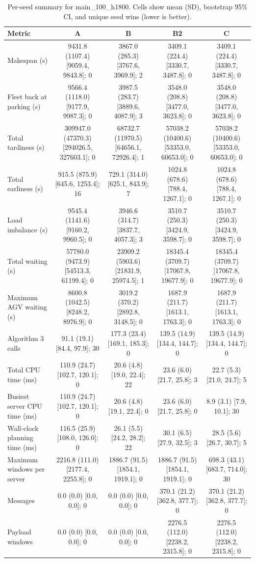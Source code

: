 \begin{table}[t]
\centering
\caption{Per-seed summary for main\_100\_h1800. Cells show mean (SD), bootstrap 95\% CI, and unique seed wins (lower is better).}
\label{tab:main-100-h1800}
\begin{tabular}{lcccc}
\toprule
Metric & A & B & B2 & C \\
\midrule
Makespan (s) & 9431.8 (1107.4) [9059.4, 9843.8]; 0 & 3867.0 (285.3) [3767.6, 3969.9]; 2 & 3409.1 (224.4) [3330.7, 3487.8]; 0 & 3409.1 (224.4) [3330.7, 3487.8]; 0 \\
Fleet back at parking (s) & 9566.4 (1118.0) [9177.9, 9987.3]; 0 & 3987.5 (283.7) [3889.6, 4087.9]; 3 & 3548.0 (208.8) [3477.0, 3623.8]; 0 & 3548.0 (208.8) [3477.0, 3623.8]; 0 \\
Total tardiness (s) & 309947.0 (47370.3) [294026.5, 327603.1]; 0 & 68732.7 (11970.5) [64656.1, 72926.4]; 1 & 57038.2 (10400.6) [53353.0, 60653.0]; 0 & 57038.2 (10400.6) [53353.0, 60653.0]; 0 \\
Total earliness (s) & 915.5 (875.9) [645.6, 1253.4]; 16 & 729.1 (314.0) [625.1, 843.9]; 7 & 1024.8 (678.6) [788.4, 1267.1]; 0 & 1024.8 (678.6) [788.4, 1267.1]; 0 \\
Load imbalance (s) & 9545.4 (1141.6) [9160.2, 9960.5]; 0 & 3946.6 (314.7) [3837.7, 4057.3]; 3 & 3510.7 (250.3) [3424.9, 3598.7]; 0 & 3510.7 (250.3) [3424.9, 3598.7]; 0 \\
Total waiting (s) & 57780.0 (9473.9) [54513.3, 61199.4]; 0 & 23909.2 (5903.6) [21831.9, 25974.5]; 1 & 18345.4 (3709.7) [17067.8, 19677.9]; 0 & 18345.4 (3709.7) [17067.8, 19677.9]; 0 \\
Maximum AGV waiting (s) & 8600.8 (1042.5) [8248.2, 8976.9]; 0 & 3019.2 (370.2) [2892.8, 3148.5]; 0 & 1687.9 (211.7) [1613.1, 1763.3]; 0 & 1687.9 (211.7) [1613.1, 1763.3]; 0 \\
Algorithm 3 calls & 91.1 (19.1) [84.4, 97.9]; 30 & 177.3 (23.4) [169.1, 185.3]; 0 & 139.5 (14.9) [134.4, 144.7]; 0 & 139.5 (14.9) [134.4, 144.7]; 0 \\
Total CPU time (ms) & 110.9 (24.7) [102.7, 120.1]; 0 & 20.6 (4.8) [19.0, 22.4]; 22 & 23.6 (6.0) [21.7, 25.8]; 3 & 22.7 (5.3) [21.0, 24.7]; 5 \\
Busiest server CPU time (ms) & 110.9 (24.7) [102.7, 120.1]; 0 & 20.6 (4.8) [19.1, 22.4]; 0 & 23.6 (6.0) [21.7, 25.8]; 0 & 8.9 (3.1) [7.9, 10.1]; 30 \\
Wall-clock planning time (ms) & 116.5 (25.9) [108.0, 126.0]; 0 & 26.1 (5.5) [24.2, 28.2]; 22 & 30.1 (6.5) [27.9, 32.5]; 3 & 28.5 (5.6) [26.7, 30.7]; 5 \\
Maximum windows per server & 2216.8 (111.0) [2177.4, 2255.8]; 0 & 1886.7 (91.5) [1854.1, 1919.1]; 0 & 1886.7 (91.5) [1854.1, 1919.1]; 0 & 698.3 (43.1) [683.7, 714.0]; 30 \\
Messages & 0.0 (0.0) [0.0, 0.0]; 0 & 0.0 (0.0) [0.0, 0.0]; 0 & 370.1 (21.2) [362.8, 377.7]; 0 & 370.1 (21.2) [362.8, 377.7]; 0 \\
Payload windows & 0.0 (0.0) [0.0, 0.0]; 0 & 0.0 (0.0) [0.0, 0.0]; 0 & 2276.5 (112.0) [2238.2, 2315.8]; 0 & 2276.5 (112.0) [2238.2, 2315.8]; 0 \\
\bottomrule
\end{tabular}
\end{table}


